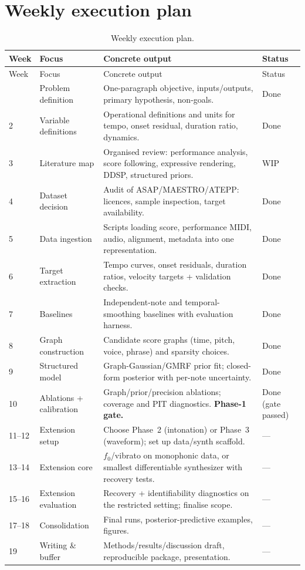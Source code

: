 \documentclass[11pt,a4paper]{report}
\begin{document}
\section{Weekly execution plan}
\begin{longtable}{@{}p{1.1cm}p{3.6cm}p{5.8cm}p{2.2cm}@{}}
\caption{Weekly execution plan.}\label{tab:weekly}\\
\toprule
Week & Focus & Concrete output & Status \\
\midrule
\endfirsthead
\toprule
Week & Focus & Concrete output & Status \\
\midrule
\endhead
\bottomrule
\endfoot
1 & Problem definition & One-paragraph objective, inputs/outputs, primary hypothesis, non-goals. & Done \\
2 & Variable definitions & Operational definitions and units for tempo, onset residual, duration ratio, dynamics. & Done \\
3 & Literature map & Organised review: performance analysis, score following, expressive rendering, DDSP, structured priors. & WIP \\
4 & Dataset decision & Audit of ASAP/MAESTRO/ATEPP: licences, sample inspection, target availability. & Done \\
5 & Data ingestion & Scripts loading score, performance MIDI, audio, alignment, metadata into one representation. & Done \\
6 & Target extraction & Tempo curves, onset residuals, duration ratios, velocity targets + validation checks. & Done \\
7 & Baselines & Independent-note and temporal-smoothing baselines with evaluation harness. & Done \\
8 & Graph construction & Candidate score graphs (time, pitch, voice, phrase) and sparsity choices. & Done \\
9 & Structured model & Graph-Gaussian/GMRF prior fit; closed-form posterior with per-note uncertainty. & Done \\
10 & Ablations + calibration & Graph/prior/precision ablations; coverage and PIT diagnostics. \textbf{Phase-1 gate.} & Done (gate passed) \\
11--12 & Extension setup & Choose Phase~2 (intonation) or Phase~3 (waveform); set up data/synth scaffold. & --- \\
13--14 & Extension core & $f_0$/vibrato on monophonic data, or smallest differentiable synthesizer with recovery tests. & --- \\
15--16 & Extension evaluation & Recovery + identifiability diagnostics on the restricted setting; finalise scope. & --- \\
17--18 & Consolidation & Final runs, posterior-predictive examples, figures. & --- \\
19 & Writing \& buffer & Methods/results/discussion draft, reproducible package, presentation. & --- \\
\end{longtable}
\end{document}
